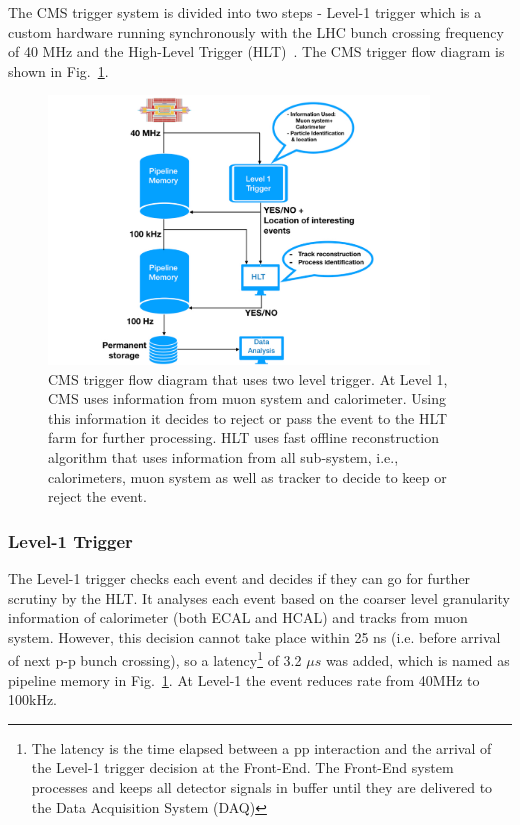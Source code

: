The CMS trigger system is divided into two steps - Level-1 trigger which is a custom hardware running synchronously with the LHC bunch crossing frequency of 40 MHz and the High-Level Trigger (HLT)~\cite{paper:JINST:CMSCollaboration,Cittolin:578006,Khachatryan2017}. The CMS trigger flow diagram is shown in Fig.~\ref{fig:cms-trigger}. 
\begin{figure}[!htbp]
	\centering
	\includegraphics[width=0.9\textwidth,height=0.63\textwidth]{figures/LHC/Trigger-flow-diagram.pdf}
	\caption{CMS trigger flow diagram that uses two level trigger. At Level 1, CMS uses information from muon system and calorimeter. Using this information it decides to reject  or pass the event to the HLT farm for further processing. HLT uses fast offline reconstruction algorithm that uses information from all sub-system, i.e., calorimeters, muon system as well as tracker to decide to keep or reject the event.}
	\label{fig:cms-trigger}
\end{figure}

\subsubsection{Level-1 Trigger} %
\label{ssub:level_1_trigger}
The Level-1 trigger checks each event and decides if they can go for further scrutiny by the HLT.
It analyses each event based on the coarser level granularity information of calorimeter (both ECAL and HCAL) and tracks from muon system.
However, this decision cannot take place within 25 ns (i.e. before arrival of next p-p bunch crossing), so a latency\footnote{The latency is the time elapsed between a pp interaction and the arrival of the Level-1 trigger decision at the Front-End. The Front-End system processes and keeps all detector signals in buffer until they are delivered to the Data Acquisition System (DAQ)} of 3.2 $\mu s$ was added, which is named as pipeline memory in Fig.~\ref{fig:cms-trigger}.
At Level-1 the event reduces rate from 40MHz to 100kHz.

